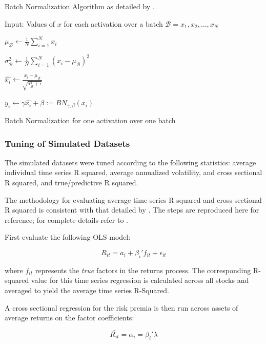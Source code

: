 \documentclass[a4paper, table]{article}
\begin{document}
Batch Normalization Algorithm as detailed by \cite{ioffe_batch_2015}.

\begin{algorithm}
	Input: Values of \(x\) for each activation over a batch \(\mathcal{B} = {x_1, x_2, \dots, x_N}\)
	
	\(\mu_\mathcal{B} \leftarrow \frac{1}{N} \sum_{i = 1}^{N}x_i\)
	
	\(\sigma_\mathcal{B}^2 \leftarrow \frac{1}{N} \sum_{i = 1}^{N}(x_i - \mu_\mathcal{B})^2\)
	
	\(\hat{x_i} \leftarrow \frac{x_i - \mu_\mathcal{B}}{\sqrt{\sigma_\mathcal{B}^2 + \epsilon}}\)
	
	\(y_i \leftarrow \gamma\hat{x_i} + \beta := BN_{\gamma, \beta}(x_i)\)
	
	\caption{Batch Normalization for one activation over one batch}
\end{algorithm}

\subsubsection{Tuning of Simulated Datasets}

The simulated datasets were tuned according to the following statistics: average individual time series R squared, average annualized volatility, and cross sectional R squared, and true/predictive R squared.

The methodology for evaluating average time series R squared and cross sectional R squared is consistent with that detailed by \cite{cochrane_asset_2005}. The steps are reproduced here for reference; for complete details refer to \cite{cochrane_asset_2005}.

First evaluate the following OLS model:

\begin{equation}
	R_{it} = a_i + \beta_i' f_{it} + \epsilon_{it} 
\end{equation}

where $f_{it}$ represents the \textit{true} factors in the returns process. The corresponding R-squared value for this time series regression is calculated across all stocks and averaged to yield the average time series R-Squared. 

A cross sectional regression for the risk premia is then run across assets of average returns on the factor coefficients:

\begin{equation}
	\bar{R_{it}} = \alpha_i = \beta_i' \lambda
\end{equation}
\end{document}
